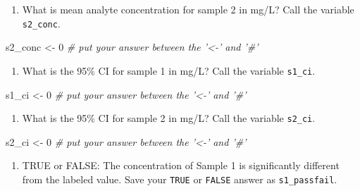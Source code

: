 \documentclass[]{tufte-book}
\newenvironment{Shaded}{}{}
\newcommand{\CommentTok}[1]{\textcolor[rgb]{0.38,0.63,0.69}{\textit{#1}}}
\newcommand{\DecValTok}[1]{\textcolor[rgb]{0.25,0.63,0.44}{#1}}
\newcommand{\NormalTok}[1]{#1}
\newcommand{\StringTok}[1]{\textcolor[rgb]{0.25,0.44,0.63}{#1}}
\providecommand{\tightlist}{%
  \setlength{\itemsep}{0pt}\setlength{\parskip}{0pt}}
\begin{document}
\begin{enumerate}
\def\labelenumi{\arabic{enumi}.}
\setcounter{enumi}{6}
\tightlist
\item
  What is mean analyte concentration for sample 2 in mg/L? Call the variable \texttt{s2\_conc}.
\end{enumerate}

\begin{Shaded}
\begin{Highlighting}[]
\NormalTok{s2_conc <-}\StringTok{ }\DecValTok{0}     \CommentTok{# put your answer between the '<-' and '#'}
\end{Highlighting}
\end{Shaded}

\begin{enumerate}
\def\labelenumi{\arabic{enumi}.}
\setcounter{enumi}{7}
\tightlist
\item
  What is the 95\% CI for sample 1 in mg/L? Call the variable \texttt{s1\_ci}.
\end{enumerate}

\begin{Shaded}
\begin{Highlighting}[]
\NormalTok{s1_ci <-}\StringTok{ }\DecValTok{0}     \CommentTok{# put your answer between the '<-' and '#'}
\end{Highlighting}
\end{Shaded}

\begin{enumerate}
\def\labelenumi{\arabic{enumi}.}
\setcounter{enumi}{8}
\tightlist
\item
  What is the 95\% CI for sample 2 in mg/L? Call the variable \texttt{s2\_ci}.
\end{enumerate}

\begin{Shaded}
\begin{Highlighting}[]
\NormalTok{s2_ci <-}\StringTok{ }\DecValTok{0}     \CommentTok{# put your answer between the '<-' and '#'}
\end{Highlighting}
\end{Shaded}

\begin{enumerate}
\def\labelenumi{\arabic{enumi}.}
\setcounter{enumi}{9}
\tightlist
\item
  TRUE or FALSE: The concentration of Sample 1 is significantly different from the labeled value. Save your \texttt{TRUE} or \texttt{FALSE} answer as \texttt{s1\_passfail}.
\end{enumerate}
\end{document}
